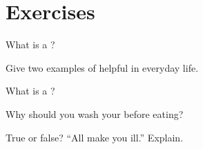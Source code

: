 \section{Exercises}

\begin{exercise}[$\star$]\label{exo:g4:microbes:1}
What is a ?
\end{exercise}

\begin{exercise}[$\star$]\label{exo:g4:microbes:2}
Give two examples of helpful  in everyday life.
\end{exercise}

\begin{exercise}[$\star$]\label{exo:g4:microbes:3}
What is a ?
\end{exercise}

\begin{exercise}[$\star$]\label{exo:g4:microbes:4}
Why should you wash your  before eating?
\end{exercise}

\begin{exercise}[$\star\star$]\label{exo:g4:microbes:5}
True or false? ``All  make you ill.'' Explain.
\end{exercise}

